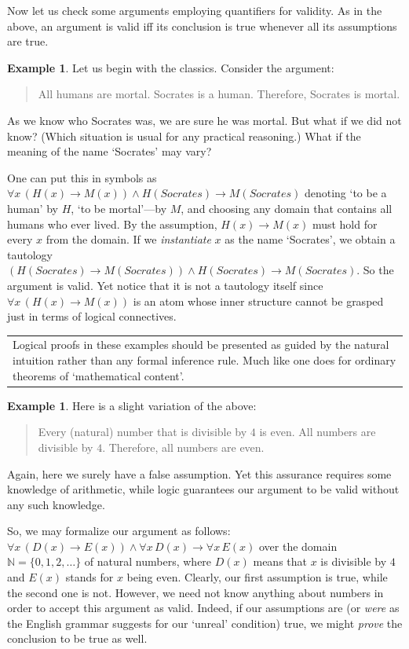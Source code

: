 \documentclass[12pt,notitlepage]{article}
\theoremstyle{plain}
\theoremstyle{definition}
\newtheorem{exm}[thm]{Example}
\theoremstyle{plain}
\newcommand{\N}{\mathbb{N}}
\newcommand{\1}{\mathbf{1}}
\newcommand{\0}{\mathbf{0}}
\newcommand{\mcomm}[1]{
\medskip\noindent\begin{tabular}{| l}
\parbox{0.99\textwidth}{{\small
#1 }}\end{tabular}
\smallskip}
\begin{document}
Now let us check some arguments employing quantifiers for validity. As in the above, an argument is valid iff its conclusion is true whenever all its assumptions are true.

\begin{exm}
Let us begin with the classics. Consider the argument:
\begin{quote}
All humans are mortal. Socrates is a human. Therefore, Socrates is mortal.
\end{quote}
As we know who Socrates was, we are sure he was mortal. But what if we did not know? (Which situation is usual for any practical reasoning.) What if the meaning of the name `Socrates' may vary?

One can put this in symbols as $\forall x\, (H(x) \to M(x)) \wedge H(Socrates) \to M(Socrates)$ denoting `to be a human' by $H$, `to be mortal'---by $M$, and choosing any domain that contains all humans who ever lived. By the assumption, $H(x) \to M(x)$ must hold for every $x$ from the domain. If we \emph{instantiate} $x$ as the name `Socrates', we obtain a tautology $(H(Socrates) \to M(Socrates)) \wedge H(Socrates) \to M(Socrates)$. So the argument is valid. Yet notice that it is not a tautology itself since $\forall x\, (H(x) \to M(x))$ is an atom whose inner structure cannot be grasped just in terms of logical connectives.
\end{exm}
\mcomm{Logical proofs in these examples should be presented as guided by the natural intuition rather than any formal inference rule. Much like one does for ordinary theorems of `mathematical content'.}

\begin{exm}
Here is a slight variation of the above:
\end{exm}
\begin{quote}
Every (natural) number that is divisible by $4$ is even. All numbers are divisible by $4$. Therefore, all numbers are even.
\end{quote}
Again, here we surely have a false assumption. Yet this assurance requires some knowledge of arithmetic, while logic guarantees our argument to be valid without any such knowledge.

So, we may formalize our argument as follows: $\forall x\, (D(x) \to E(x)) \wedge \forall x\, D(x) \to \forall x\, E(x)$ over the domain $\N = \{0,1,2,\ldots\}$ of natural numbers, where $D(x)$ means that $x$ is divisible by $4$ and $E(x)$ stands for $x$ being even. Clearly, our first assumption is true, while the second one is not. However, we need not know anything about numbers in order to accept this argument as valid. Indeed, if our assumptions are (or \emph{were} as the English grammar suggests for our `unreal' condition) true, we might \emph{prove} the conclusion to be true as well.
\end{document}
